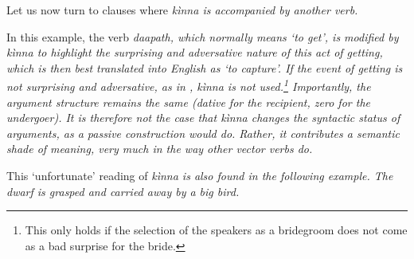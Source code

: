  
Let us now turn to clauses where \em kìnna \em is accompanied by another verb.


In this example, the verb \em daapath\em, which normally means `to get', is modified by \em kìnna \em to highlight the surprising and adversative nature of this act of getting, which is then best translated into English as  `to capture'. If the event of getting is not surprising and adversative, as in , \em kìnna \em is not used.\footnote{This only holds if the selection of the speakers as a bridegroom does not come as a bad surprise for the bride.} Importantly, the argument structure remains the same (dative for the recipient, zero for the undergoer). It is therefore not the case that \em kìnna \em changes the syntactic status of arguments, as a passive construction would do. Rather, it contributes a semantic shade of meaning, very much in the way other vector verbs do.

 

 
 
This `unfortunate' reading of \em kìnna \em  is also found in the following example. The dwarf is grasped and carried away by a big bird.



